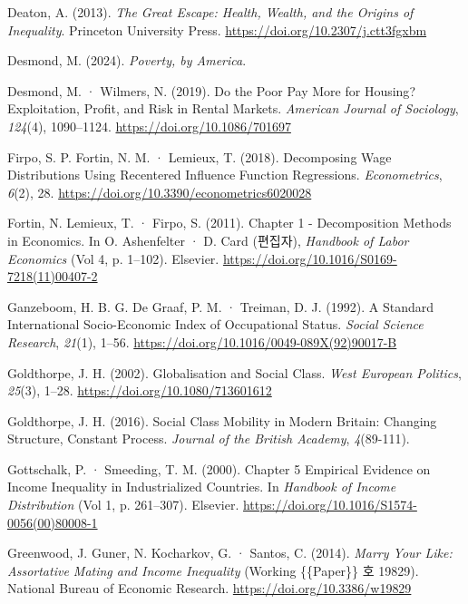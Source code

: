 \documentclass[
  letterpaper,
  DIV=11,
  numbers=noendperiod]{scrartcl}
\newlength{\cslhangindent}
\newenvironment{CSLReferences}[2] %
 {\begin{list}{}{%
  \setlength{\itemindent}{0pt}
  \setlength{\leftmargin}{0pt}
  \setlength{\parsep}{0pt}
  \ifodd #1
   \setlength{\leftmargin}{\cslhangindent}
   \setlength{\itemindent}{-1\cslhangindent}
  \fi
  \setlength{\itemsep}{#2\baselineskip}}}
 {\end{list}}
\begin{document}
\begin{CSLReferences}{1}{0}
Deaton, A. (2013). \emph{The {Great Escape}: {Health}, {Wealth}, and the
{Origins} of {Inequality}}. Princeton University Press.
\url{https://doi.org/10.2307/j.ctt3fgxbm}

Desmond, M. (2024). \emph{Poverty, by {America}}.

Desmond, M. · Wilmers, N. (2019). Do the {Poor Pay More} for {Housing}?
{Exploitation}, {Profit}, and {Risk} in {Rental Markets}. \emph{American
Journal of Sociology}, \emph{124}(4), 1090--1124.
\url{https://doi.org/10.1086/701697}

Firpo, S. P. Fortin, N. M. · Lemieux, T. (2018). Decomposing {Wage
Distributions Using Recentered Influence Function Regressions}.
\emph{Econometrics}, \emph{6}(2), 28.
\url{https://doi.org/10.3390/econometrics6020028}

Fortin, N. Lemieux, T. · Firpo, S. (2011). Chapter 1 - {Decomposition
Methods} in {Economics}. In O. Ashenfelter · D. Card (편집자),
\emph{Handbook of {Labor Economics}} (Vol 4, p. 1--102). Elsevier.
\url{https://doi.org/10.1016/S0169-7218(11)00407-2}

Ganzeboom, H. B. G. De Graaf, P. M. · Treiman, D. J. (1992). A Standard
International Socio-Economic Index of Occupational Status. \emph{Social
Science Research}, \emph{21}(1), 1--56.
\url{https://doi.org/10.1016/0049-089X(92)90017-B}

Goldthorpe, J. H. (2002). Globalisation and {Social Class}. \emph{West
European Politics}, \emph{25}(3), 1--28.
\url{https://doi.org/10.1080/713601612}

Goldthorpe, J. H. (2016). Social Class Mobility in Modern {Britain}:
Changing Structure, Constant Process. \emph{Journal of the British
Academy}, \emph{4}(89-111).

Gottschalk, P. · Smeeding, T. M. (2000). Chapter 5 {Empirical} Evidence
on Income Inequality in Industrialized Countries. In \emph{Handbook of
{Income Distribution}} (Vol 1, p. 261--307). Elsevier.
\url{https://doi.org/10.1016/S1574-0056(00)80008-1}

Greenwood, J. Guner, N. Kocharkov, G. · Santos, C. (2014). \emph{Marry
{Your Like}: {Assortative Mating} and {Income Inequality}} (Working
\{\{Paper\}\} 호 19829). National Bureau of Economic Research.
\url{https://doi.org/10.3386/w19829}


\end{CSLReferences}
\end{document}
